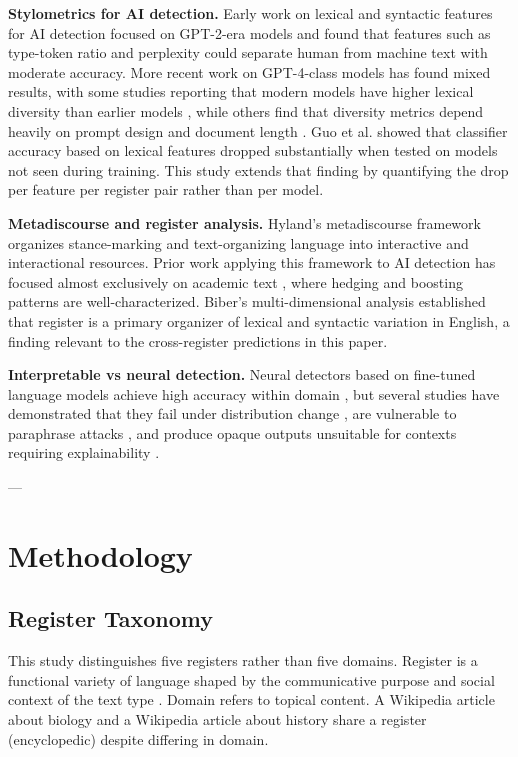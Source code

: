 \documentclass{article}
\begin{document}
\textbf{Stylometrics for AI detection.} Early work on lexical and syntactic features for AI detection focused on GPT-2-era models \cite{ref7} and found that features such as type-token ratio and perplexity could separate human from machine text with moderate accuracy. More recent work on GPT-4-class models has found mixed results, with some studies reporting that modern models have higher lexical diversity than earlier models \cite{ref8}, while others find that diversity metrics depend heavily on prompt design and document length \cite{ref9}. Guo et al. \cite{ref9} showed that classifier accuracy based on lexical features dropped substantially when tested on models not seen during training. This study extends that finding by quantifying the drop per feature per register pair rather than per model.

\textbf{Metadiscourse and register analysis.} Hyland's metadiscourse framework \cite{ref10} organizes stance-marking and text-organizing language into interactive and interactional resources. Prior work applying this framework to AI detection has focused almost exclusively on academic text \cite{ref8,ref11}, where hedging and boosting patterns are well-characterized. Biber's multi-dimensional analysis \cite{ref12} established that register is a primary organizer of lexical and syntactic variation in English, a finding relevant to the cross-register predictions in this paper.

\textbf{Interpretable vs neural detection.} Neural detectors based on fine-tuned language models achieve high accuracy within domain \cite{ref3}, but several studies have demonstrated that they fail under distribution change \cite{ref1,ref2}, are vulnerable to paraphrase attacks \cite{ref13}, and produce opaque outputs unsuitable for contexts requiring explainability \cite{ref14}.

---

\section{Methodology}

\subsection{Register Taxonomy}

This study distinguishes five registers rather than five domains. Register is a functional variety of language shaped by the communicative purpose and social context of the text type \cite{ref12}. Domain refers to topical content. A Wikipedia article about biology and a Wikipedia article about history share a register (encyclopedic) despite differing in domain.
\end{document}
